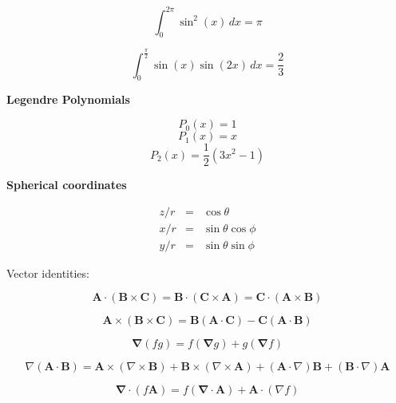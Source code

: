 \documentclass[11pt]{article}
\begin{document}
\begin{multicols}{2}
\begin{equation}
\int_{0}^{2 \pi} \sin^{2}{\left (x \right )}\, dx  =  \pi
\end{equation}

\begin{equation}
\int_{0}^{\frac{\pi}{2}} \sin{\left (x \right )} \sin{\left (2 x \right )}\, dx  =  \frac{2}{3}
\end{equation}



{\bf Legendre Polynomials}

\begin{equation}
P_0(x) = 1
\end{equation}
\begin{equation}
P_1(x) = x
\end{equation}
\begin{equation}
P_2(x) = \frac{1}{2} (3x^2-1)
\end{equation}

{\bf Spherical coordinates}

\begin{eqnarray}
z/r & = & \cos \theta \\
x/r & = & \sin \theta \cos \phi \\
y/r & = & \sin \theta \sin \phi
\end{eqnarray}

\end{multicols}

\pagebreak

Vector identities:

\[
\mathbf { A } \cdot ( \mathbf { B } \times \mathbf { C } ) = \mathbf { B } \cdot ( \mathbf { C } \times \mathbf { A } ) = \mathbf { C } \cdot ( \mathbf { A } \times \mathbf { B } )
\]


\[
\mathbf { A } \times ( \mathbf { B } \times \mathbf { C } ) = \mathbf { B } ( \mathbf { A } \cdot \mathbf { C } ) - \mathbf { C } ( \mathbf { A } \cdot \mathbf { B } )
\]


\[
\boldsymbol { \nabla } ( f g ) = f ( \boldsymbol { \nabla } g ) + g ( \boldsymbol { \nabla } f )
\]


\[
\nabla ( \mathbf { A } \cdot \mathbf { B } ) = \mathbf { A } \times ( \nabla \times \mathbf { B } ) + \mathbf { B } \times ( \nabla \times \mathbf { A } ) + ( \mathbf { A } \cdot \nabla ) \mathbf { B } + ( \mathbf { B } \cdot \nabla ) \mathbf { A }
\]


\[
\boldsymbol { \nabla } \cdot ( f \mathbf { A } ) = f ( \mathbf { \nabla } \cdot \mathbf { A } ) + \mathbf { A } \cdot ( \nabla f )
\]
\end{document}
